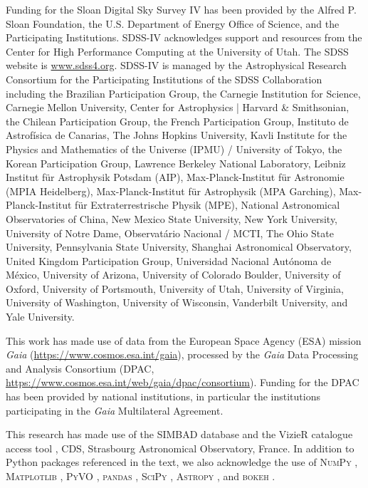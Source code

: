 \documentclass[fleqn,usenatbib]{mnras}
\begin{document}
Funding for the Sloan Digital Sky Survey IV has been provided by the Alfred P. Sloan Foundation, the U.S. Department of Energy Office of Science, and the Participating Institutions. 
SDSS-IV acknowledges support and resources from the Center for High Performance Computing at the University of Utah.
The SDSS website is \url{www.sdss4.org}.
SDSS-IV is managed by the Astrophysical Research Consortium for the Participating Institutions of the SDSS Collaboration including
the Brazilian Participation Group,
the Carnegie Institution for Science,
Carnegie Mellon University,
Center for Astrophysics | Harvard \& Smithsonian,
the Chilean Participation Group,
the French Participation Group,
Instituto de Astrof\'isica de Canarias,
The Johns Hopkins University,
Kavli Institute for the Physics and Mathematics of the Universe (IPMU) / University of Tokyo,
the Korean Participation Group,
Lawrence Berkeley National Laboratory,
Leibniz Institut f\"ur Astrophysik Potsdam (AIP),
Max-Planck-Institut f\"ur Astronomie (MPIA Heidelberg),
Max-Planck-Institut f\"ur Astrophysik (MPA Garching),
Max-Planck-Institut f\"ur Extraterrestrische Physik (MPE),
National Astronomical Observatories of China, New Mexico State University,
New York University,
University of Notre Dame,
Observat\'ario Nacional / MCTI,
The Ohio State University,
Pennsylvania State University,
Shanghai Astronomical Observatory,
United Kingdom Participation Group,
Universidad Nacional Aut\'onoma de M\'exico,
University of Arizona,
University of Colorado Boulder,
University of Oxford,
University of Portsmouth,
University of Utah,
University of Virginia,
University of Washington,
University of Wisconsin,
Vanderbilt University,
and Yale University.

This work has made use of data from the European Space Agency (ESA) mission \textit{Gaia} (\url{https://www.cosmos.esa.int/gaia}), processed by the \textit{Gaia} Data Processing and Analysis Consortium (DPAC,
\url{https://www.cosmos.esa.int/web/gaia/dpac/consortium}).
Funding for the DPAC has been provided by national institutions, in particular the institutions participating in the \textit{Gaia} Multilateral Agreement.

This research has made use of the SIMBAD database \citep{simbad} and the VizieR catalogue access tool \citep{vizier}, CDS, Strasbourg Astronomical Observatory, France.
In addition to Python packages referenced in the text, we also acknowledge the use of \textsc{NumPy} \citep{numpy}, \textsc{Matplotlib} \citep{matplotlib}, \textsc{PyVO} \citep{pyvo}, \textsc{pandas} \citep{pandas1, pandas2}, \textsc{SciPy} \citep{scipy}, \textsc{Astropy} \citep{astropy1, astropy2, astropy3}, and \textsc{bokeh} \citep{bokeh}.
\end{document}
